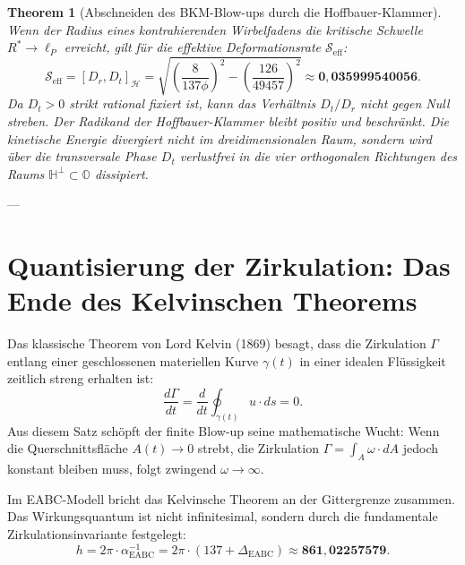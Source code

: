 \documentclass[11pt,a4paper]{article}
\newtheorem{theorem}{Theorem}
\begin{document}
\begin{theorem}[Abschneiden des BKM-Blow-ups durch die Hoffbauer-Klammer]
Wenn der Radius eines kontrahierenden Wirbelfadens die kritische Schwelle $R^* \to \ell_P$ erreicht, gilt für die effektive Deformationsrate $\mathcal{S}_{\mathrm{eff}}$:
\begin{equation}
\mathcal{S}_{\mathrm{eff}} = [D_r, D_t]_{\mathcal{H}} = \sqrt{\left(\frac{8}{137\phi}\right)^2 - \left(\frac{126}{49457}\right)^2} \approx \mathbf{0{,}035999540056}.
\end{equation}
Da $D_t > 0$ strikt rational fixiert ist, kann das Verhältnis $D_t / D_r$ nicht gegen Null streben. Der Radikand der Hoffbauer-Klammer bleibt positiv und beschränkt. Die kinetische Energie divergiert nicht im dreidimensionalen Raum, sondern wird über die transversale Phase $D_t$ verlustfrei in die vier orthogonalen Richtungen des Raums $\mathbb{H}^\perp \subset \mathbb{O}$ dissipiert.
\end{theorem}

---

\section{Quantisierung der Zirkulation: Das Ende des Kelvinschen Theorems}

Das klassische Theorem von Lord Kelvin (1869) besagt, dass die Zirkulation $\Gamma$ entlang einer geschlossenen materiellen Kurve $\gamma(t)$ in einer idealen Flüssigkeit zeitlich streng erhalten ist:
\begin{equation}
\frac{d\Gamma}{d t} = \frac{d}{dt} \oint_{\gamma(t)} u \cdot ds = 0.
\end{equation}
Aus diesem Satz schöpft der finite Blow-up seine mathematische Wucht: Wenn die Querschnittsfläche $A(t) \to 0$ strebt, die Zirkulation $\Gamma = \int_A \omega \cdot dA$ jedoch konstant bleiben muss, folgt zwingend $\omega \to \infty$.

Im EABC-Modell bricht das Kelvinsche Theorem an der Gittergrenze zusammen. Das Wirkungsquantum ist nicht infinitesimal, sondern durch die fundamentale Zirkulationsinvariante festgelegt:
\begin{equation}
h = 2\pi \cdot \alpha^{-1}_{\mathrm{EABC}} = 2\pi \cdot (137 + \Delta_{\mathrm{EABC}}) \approx \mathbf{861{,}02257579}.
\end{equation}
\end{document}
